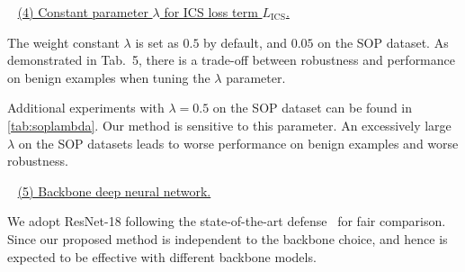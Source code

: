 ~\newline
\noindent\ul{(4) Constant parameter $\lambda$ for ICS loss term $L_\text{ICS}$.}

The weight constant $\lambda$ is set as $0.5$ by default, and $0.05$ on the SOP dataset.
%
As demonstrated in Tab.~5, there is a trade-off between robustness and
performance on benign examples when tuning the $\lambda$ parameter.

Additional experiments with $\lambda=0.5$ on the SOP dataset can be found in \cref{tab:soplambda}.
%
Our method is sensitive to this parameter.
An excessively large $\lambda$ on the SOP datasets leads to worse performance on benign examples
and worse robustness.

\begin{table*}
	\caption{An excessively large $\lambda$ may lead to worse performance and robustness.}
	\label{tab:soplambda}
\end{table*}

~\newline
\noindent\ul{(5) Backbone deep neural network.}

We adopt ResNet-18 following the state-of-the-art defense~\cite{robrank} for
fair comparison.
%
Since our proposed method is independent to the backbone choice, and hence
is expected to be effective with different backbone models.


